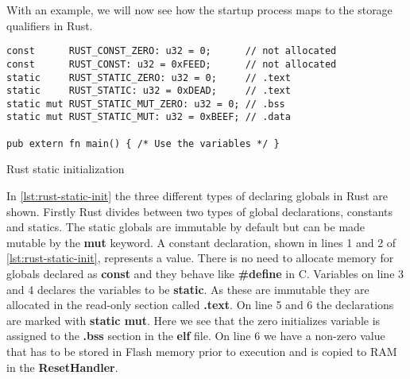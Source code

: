 With an example, we will now see how the startup process maps to the storage qualifiers in Rust.
\begin{listing}[H]
\begin{verbatim}
const      RUST_CONST_ZERO: u32 = 0;      // not allocated
const      RUST_CONST: u32 = 0xFEED;      // not allocated
static     RUST_STATIC_ZERO: u32 = 0;     // .text
static     RUST_STATIC: u32 = 0xDEAD;     // .text
static mut RUST_STATIC_MUT_ZERO: u32 = 0; // .bss
static mut RUST_STATIC_MUT: u32 = 0xBEEF; // .data

pub extern fn main() { /* Use the variables */ }
\end{verbatim}
\caption{Rust static initialization}
\label{lst:rust-static-init}
\end{listing}
In \autoref{lst:rust-static-init} the three different types of declaring globals in Rust are shown.
Firstly Rust divides between two types of global declarations, constants and statics.
The static globals are immutable by default but can be made mutable by the \textbf{mut} keyword.
A constant declaration, shown in lines 1 and 2 of \autoref{lst:rust-static-init}, represents a value.
There is no need to allocate memory for globals declared as \textbf{const} and they behave like \textbf{\#define} in C. 
Variables on line 3 and 4 declares the variables to be \textbf{static}.
As these are immutable they are allocated in the read-only section called \textbf{.text}.
On line 5 and 6 the declarations are marked with \textbf{static mut}.
Here we see that the zero initializes variable is assigned to the \textbf{.bss} section in the \textbf{elf} file.
On line 6 we have a non-zero value that has to be stored in Flash memory prior to execution and is copied to RAM in the \textbf{ResetHandler}.
